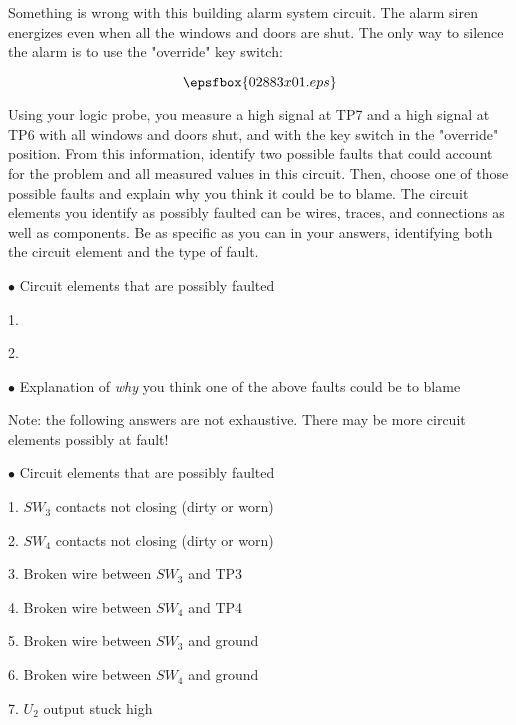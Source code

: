 

Something is wrong with this building alarm system circuit.  The alarm siren energizes even when all the windows and doors are shut.  The only way to silence the alarm is to use the "override" key switch:

$$\epsfbox{02883x01.eps}$$

Using your logic probe, you measure a high signal at TP7 and a high signal at TP6 with all windows and doors shut, and with the key switch in the "override" position.  From this information, identify two possible faults that could account for the problem and all measured values in this circuit.  Then, choose one of those possible faults and explain why you think it could be to blame.  The circuit elements you identify as possibly faulted can be wires, traces, and connections as well as components.  Be as specific as you can in your answers, identifying both the circuit element and the type of fault.

\medskip
\goodbreak
\item{$\bullet$} Circuit elements that are possibly faulted
\item{1.}
\item{2.} 
\medskip

\medskip
\goodbreak
\item{$\bullet$} Explanation of {\it why} you think one of the above faults could be to blame

\vskip 30pt







Note: the following answers are not exhaustive.  There may be more circuit elements possibly at fault!

\medskip
\goodbreak
\item{$\bullet$} Circuit elements that are possibly faulted
\item{1.} $SW_3$ contacts not closing (dirty or worn)
\item{2.} $SW_4$ contacts not closing (dirty or worn)
\item{3.} Broken wire between $SW_3$ and TP3
\item{4.} Broken wire between $SW_4$ and TP4
\item{5.} Broken wire between $SW_3$ and ground
\item{6.} Broken wire between $SW_4$ and ground
\item{7.} $U_2$ output stuck high
\medskip

